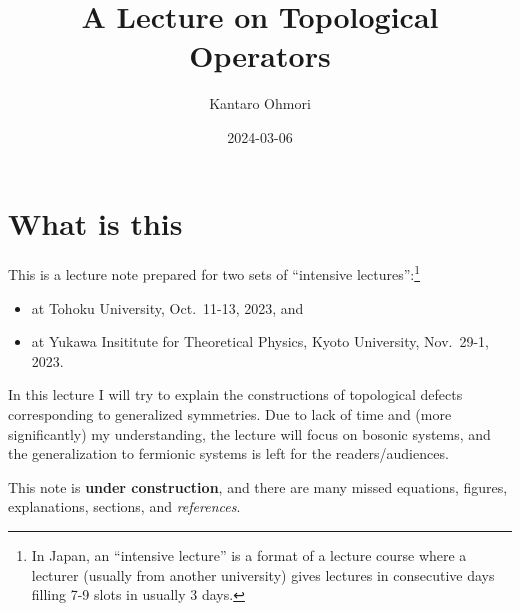 \documentclass[
  letterpaper,
  DIV=11,
  numbers=noendperiod]{scrreport}
\title{A Lecture on Topological Operators}
\author{Kantaro Ohmori}
\date{2024-03-06}
\providecommand{\tightlist}{%
  \setlength{\itemsep}{0pt}\setlength{\parskip}{0pt}}\usepackage{longtable,booktabs,array}
\renewcommand*\contentsname{Table of contents}
\newcommand\contentsname{Table of contents}
\begin{document}
\maketitle

\renewcommand*\contentsname{Table of contents}
{
\hypersetup{linkcolor=}
\setcounter{tocdepth}{2}
\tableofcontents
}

\chapter*{What is this}\label{what-is-this}


This is a lecture note prepared for two sets of ``intensive
lectures'':\footnote{In Japan, an ``intensive lecture'' is a format of a
  lecture course where a lecturer (usually from another university)
  gives lectures in consecutive days filling 7-9 slots in usually 3
  days.}

\begin{itemize}
\tightlist
\item
  at Tohoku University, Oct.~11-13, 2023, and
\item
  at Yukawa Insititute for Theoretical Physics, Kyoto University,
  Nov.~29-1, 2023.
\end{itemize}

In this lecture I will try to explain the constructions of topological
defects corresponding to generalized symmetries. Due to lack of time and
(more significantly) my understanding, the lecture will focus on bosonic
systems, and the generalization to fermionic systems is left for the
readers/audiences.

\begin{tcolorbox}[enhanced jigsaw, opacityback=0, opacitybacktitle=0.6, leftrule=.75mm, arc=.35mm, coltitle=black, breakable, colframe=quarto-callout-warning-color-frame, titlerule=0mm, colback=white, bottomrule=.15mm, left=2mm, colbacktitle=quarto-callout-warning-color!10!white, toptitle=1mm, bottomtitle=1mm, title=\textcolor{quarto-callout-warning-color}{\faExclamationTriangle}\hspace{0.5em}{Warning}, rightrule=.15mm, toprule=.15mm]

This note is \textbf{under construction}, and there are many missed
equations, figures, explanations, sections, and \emph{references}.

\end{tcolorbox}
\end{document}
